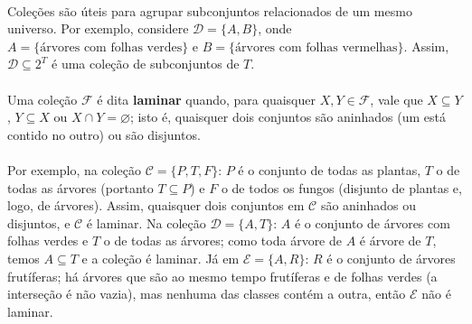 \documentclass[12pt,a4paper]{article}
\begin{document}
\paragraph{}
Coleções são úteis para agrupar subconjuntos relacionados de um mesmo universo. Por exemplo, considere \(\mathcal{D} = \{A, B\}\), onde \(A = \{\text{árvores com folhas verdes}\}\) e \(B = \{\text{árvores com folhas vermelhas}\}\). Assim, \(\mathcal{D} \subseteq 2^{T}\) é uma coleção de subconjuntos de \(T\).

\paragraph{}
Uma coleção \(\mathcal{F}\) é dita \textbf{laminar} quando, para quaisquer \(X, Y \in \mathcal{F}\), vale que \(X \subseteq Y\), \(Y \subseteq X\) ou \(X \cap Y = \varnothing\); isto é, quaisquer dois conjuntos são aninhados (um está contido no outro) ou são disjuntos. 

\paragraph{}
Por exemplo, na coleção \(\mathcal{C} = \{P, T, F\}\): \(P\) é o conjunto de todas as plantas, \(T\) o de todas as árvores (portanto \(T\subseteq P\)) e \(F\) o de todos os fungos (disjunto de plantas e, logo, de árvores). Assim, quaisquer dois conjuntos em \(\mathcal{C}\) são aninhados ou disjuntos, e \(\mathcal{C}\) é laminar. Na coleção \(\mathcal{D} = \{A, T\}\): \(A\) é o conjunto de árvores com folhas verdes e \(T\) o de todas as árvores; como toda árvore de \(A\) é árvore de \(T\), temos \(A\subseteq T\) e a coleção é laminar. Já em \(\mathcal{E} = \{A, R\}\): \(R\) é o conjunto de árvores frutíferas; há árvores que são ao mesmo tempo frutíferas e de folhas verdes (a interseção é não vazia), mas nenhuma das classes contém a outra, então \(\mathcal{E}\) não é laminar.
\end{document}
